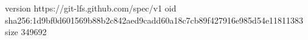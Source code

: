 version https://git-lfs.github.com/spec/v1
oid sha256:1d9bf0d601569b88b2c842aed9cadd60a18c7cb89f427916e985d54e11811383
size 349692
